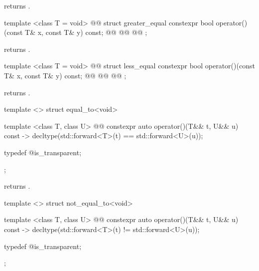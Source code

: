 \begin{itemdescr}
\pnum
{} returns .
\end{itemdescr}

%
\begin{itemdecl}
template <class T = void>
  @@
struct greater_equal {
  constexpr bool operator()(const T& x, const T& y) const;
  @@
  @@
  @@
};
\end{itemdecl}

\begin{itemdescr}
\pnum
{} returns .
\end{itemdescr}

%
\begin{itemdecl}
template <class T = void>
  @@
struct less_equal {
  constexpr bool operator()(const T& x, const T& y) const;
  @@
  @@
  @@
};
\end{itemdecl}

\begin{itemdescr}
\pnum
{} returns .
\end{itemdescr}

%
\begin{itemdecl}
template <> struct equal_to<void> {
  template <class T, class U>
    @@
  constexpr auto operator()(T&& t, U&& u) const
    -> decltype(std::forward<T>(t) == std::forward<U>(u));

  typedef @\unspec@ is_transparent;
};
\end{itemdecl}

\begin{itemdescr}
\pnum
{} returns .
\end{itemdescr}

%
\begin{itemdecl}
template <> struct not_equal_to<void> {
  template <class T, class U>
    @@
  constexpr auto operator()(T&& t, U&& u) const
    -> decltype(std::forward<T>(t) != std::forward<U>(u));

  typedef @\unspec@ is_transparent;
};
\end{itemdecl}

